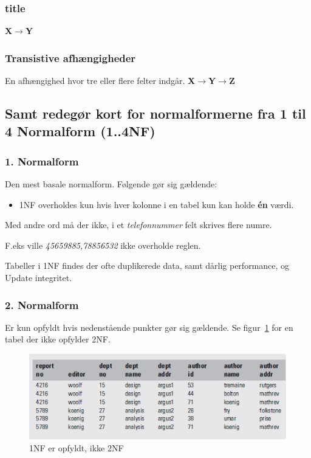 \subsubsection{title}

\textbf{X$\rightarrow$Y}
\subsubsection{Transistive afhængigheder}
En afhængighed hvor tre eller flere felter indgår.
\textbf{X$\rightarrow$Y$\rightarrow$Z}


\subsection{Samt redegør kort for normalformerne fra 1 til 4 Normalform (1..4NF)}

\subsubsection{1. Normalform}
Den mest basale normalform. Følgende gør sig gældende:

\begin{itemize}
	\item 1NF overholdes kun hvis hver kolonne i en tabel kun kan holde \textbf{én} værdi. 
\end{itemize}

Med andre ord må der ikke, i et \textit{telefonnummer} felt skrives flere numre. 

F.eks ville \textit{45659885,78856532} ikke overholde reglen.


Tabeller i 1NF findes der ofte duplikerede data, samt dårlig performance, og Update integritet.
	
\subsubsection{2. Normalform}
Er kun opfyldt hvis nedenstående punkter gør sig gældende. Se figur~\ref{fig:not2NF} for en tabel der ikke opfylder 2NF.
	
\begin{figure}[H]
	\centering
	\includegraphics[width=0.8\linewidth]{figs/spm5/not2NF.PNG}
	\caption{1NF er opfyldt, ikke 2NF}
	\label{fig:not2NF}
\end{figure}
	
